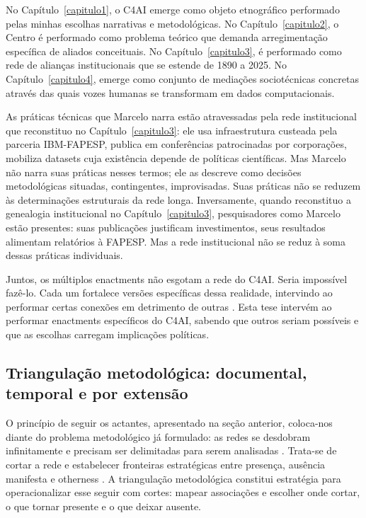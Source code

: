 No Capítulo~\ref{capitulo1}, o C4AI emerge como objeto etnográfico performado pelas minhas escolhas narrativas e metodológicas. No Capítulo~\ref{capitulo2}, o Centro é performado como problema teórico que demanda arregimentação específica de aliados conceituais. No Capítulo~\ref{capitulo3}, é performado como rede de alianças institucionais que se estende de 1890 a 2025. No Capítulo~\ref{capitulo4}, emerge como conjunto de mediações sociotécnicas concretas através das quais vozes humanas se transformam em dados computacionais.

As práticas técnicas que Marcelo narra estão atravessadas pela rede institucional que reconstituo no Capítulo~\ref{capitulo3}: ele usa infraestrutura custeada pela parceria IBM-FAPESP, publica em conferências patrocinadas por corporações, mobiliza datasets cuja existência depende de políticas científicas. Mas Marcelo não narra suas práticas nesses termos; ele as descreve como decisões metodológicas situadas, contingentes, improvisadas. Suas práticas não se reduzem às determinações estruturais da rede longa. Inversamente, quando reconstituo a genealogia institucional no Capítulo~\ref{capitulo3}, pesquisadores como Marcelo estão presentes: suas publicações justificam investimentos, seus resultados alimentam relatórios à FAPESP. Mas a rede institucional não se reduz à soma dessas práticas individuais.

Juntos, os múltiplos enactments não esgotam a rede do C4AI. Seria impossível fazê-lo. Cada um fortalece versões específicas dessa realidade, intervindo ao performar certas conexões em detrimento de outras \parencite{Law2004After}. Esta tese intervém ao performar enactments específicos do C4AI, sabendo que outros seriam possíveis e que as escolhas carregam implicações políticas.
\subsection{Triangulação metodológica: documental, temporal e por extensão}
\label{subsec:triangulacao_cap1}

O princípio de seguir os actantes, apresentado na seção anterior, coloca-nos diante do problema metodológico já formulado: as redes se desdobram infinitamente e precisam ser delimitadas para serem analisadas \parencite{strathern2011cortando}. Trata-se de cortar a rede e estabelecer fronteiras estratégicas entre presença, ausência manifesta e otherness \parencite{Law2004After}. A triangulação metodológica constitui estratégia para operacionalizar esse seguir com cortes: mapear associações e escolher onde cortar, o que tornar presente e o que deixar ausente.

